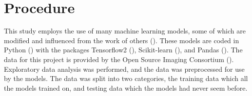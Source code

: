 \documentclass[12pt]{article}
\begin{document}




\section{Procedure}

This study employs the use of many machine learning models, some of which are modified and influenced from the work of others (\cite{kaggle}).
These models are coded in Python (\cite{10.5555/1593511}) with the packages Tensorflow2 (\cite{tensorflow2015-whitepaper}), Scikit-learn (\cite{scikit-learn}), and Pandas (\cite{mckinney2010data}).
The data for this project is provided by the Open Source Imaging Consortium (\cite{kaggle}).
Exploratory data analysis was performed, and the data was preprocessed for use by the models.
The data was split into two categories, the training data which all the models trained on, and testing data which the models had never seem before.


\end{document}
